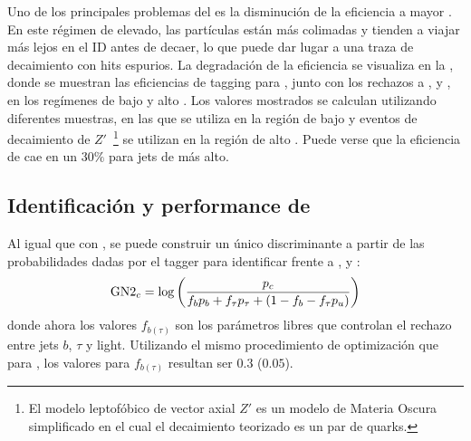 Uno de los principales problemas del \btagging es la disminución de la eficiencia a mayor \pt. En este régimen de \pt elevado, las partículas est\'an m\'as colimadas y tienden a viajar más lejos en el \ac{ID} antes de decaer, lo que puede dar lugar a una traza de decaimiento con hits espurios. La degradación de la eficiencia se visualiza en la \Tab{\ref{tab:objects:ftag:btag_efficiency_original}}, donde se muestran las eficiencias de tagging para \bjets, junto con los rechazos a \cjets, \ljets y \tjets, en los regímenes de bajo y alto \pt. Los valores mostrados se calculan utilizando diferentes muestras, en las que \ttbar se utiliza en la región de bajo \pt y eventos de decaimiento de \(Z'\)~\footnote{El modelo leptof\'obico de vector axial \(Z'\) es un modelo de Materia Oscura simplificado en el cual el decaimiento teorizado es un par de quarks.} se utilizan en la región de alto \pt. Puede verse que la eficiencia de \btag cae en un \(30\%\) para jets de \pt más alto.

\begin{table}[ht!]
    \caption{Medidas de eficiencias de \btagging, y de rechazos de \cjets, \ljets y \tjets, en los regímenes de bajo y alto \pt.}
    \label{tab:objects:ftag:btag_efficiency_original}
\end{table}

\subsection{Identificaci\'on y performance de \ctagging}

Al igual que con \btagging, se puede construir un único discriminante a partir de las probabilidades dadas por el tagger para identificar \cjets frente a \bjets, \tjets y \ljets:
\begin{equation}
    \text{GN2}_{c} = \log \left(
        \frac{p_c}{f_b p_b + f_{\tau} p_{\tau} + \left(1-f_b-f_{\tau}p_u\right)}
    \right)
\end{equation}
donde ahora los valores \(f_{b(\tau)}\) son los parámetros libres que controlan el rechazo entre jets \(b\), \(\tau\) y light. Utilizando el mismo procedimiento de optimización que para \btagging, los valores para \(f_{b(\tau)}\) resultan ser \(0.3\) (\(0.05\)).

